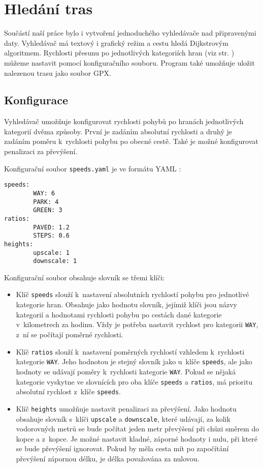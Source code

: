 \chapter{Hledání tras}
Součástí naší práce bylo i vytvoření jednoduchého vyhledávače nad připravenými
daty. Vyhledávač má textový i grafický režim a cestu hledá Dijkstrovým
algoritmem. Rychlosti přesunu po jednotlivých kategoriích hran (viz str.
\pageref{label:kategorie}) můžeme nastavit pomocí konfiguračního souboru.
Program také umožňuje uložit nalezenou trasu jako soubor GPX. \cite{gpxspec}  

\section{Konfigurace}
Vyhledávač umožňuje konfigurovat rychlosti pohybů po hranách jednotlivých
kategorií dvěma způsoby. První je zadáním absolutní rychlosti a druhý je zadáním
poměru k~rychlosti pohybu po obecné cestě. Také je možné konfigurovat penalizaci
za převýšení.

Konfigurační soubor \verb|speeds.yaml| je ve formátu YAML \cite{yamlspec}: 
\begin{verbatim}
speeds:
        WAY: 6
        PARK: 4
        GREEN: 3
ratios:
        PAVED: 1.2
        STEPS: 0.6
heights:
        upscale: 1
        downscale: 1
\end{verbatim}
Konfigurační soubor obsahuje slovník se třemi klíči:
\begin{itemize}
	\item Klíč \verb|speeds| slouží k~nastavení absolutních rychlostí pohybu
	pro jednotlivé kategorie hran. Obsahuje jako hodnotu slovník, jejímiž klíči jsou
	názvy kategorií a hodnotami rychlosti pohybu po cestách dané kategorie
v~kilometrech za hodinu. Vždy je potřeba nastavit rychlost pro kategorii
	\verb|WAY|, z~ní se počítají poměrné rychlosti.
	\item Klíč \verb|ratios| slouží k~nastavení poměrných rychlostí vzhledem
	k~rychlosti kategorie \verb|WAY|. Jeho hodnotou je stejný slovník jako
u~klíče \verb|speeds|, ale jako hodnoty se udávají poměry k~rychlosti
	kategorie \verb|WAY|. Pokud se nějaká kategorie vyskytne ve slovnících pro
	oba klíče \verb|speeds| a \verb|ratios|, má prioritu absolutní rychlost
	z~klíče \verb|speeds|.
	\item Klíč \verb|heights| umožňuje nastavit penalizaci za převýšení.
	Jako hodnotu obsahuje slovník s~klíči \verb|upscale| a \verb|downscale|,
	které udávají, za kolik vodorovných metrů se bude počítat jeden metr
	převýšení při chůzi směrem do kopce a z~kopce. Je možné nastavit kladné,
	záporné hodnoty i nulu, při které se bude převýšení ignorovat. Pokud by
	měla cesta mít po započítání převýšení zápornou délku, je délka
	považována za nulovou.
\end{itemize}


